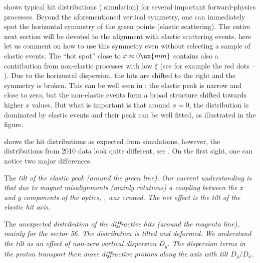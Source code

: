  shows typical hit distributions ( simulation) for several important forward-physics processes. Beyond the aforementioned vertical symmetry, one can immediately spot the horizontal symmetry of the green points (elastic scattering). The entire next section  will be devoted to the alignment with elastic scattering events, here let us comment on how to use this symmetry even without selecting a sample of elastic events. The ``hot spot'' close to $x\approx 0\un{mm}$ contains also a contribution from non-elastic processes with low $\xi$ (see for example the red dots -- ). Due to the horizontal dispersion, the hits are shifted to the right and the symmetry is broken. This can be well seen in : the elastic peak is narrow and close to zero, but the non-elastic events form a broad structure shifted towards higher $x$ values. But what is important is that around $x=0$, the distribution is dominated by elastic events and their peak can be well fitted, as illustrated in the figure.


 shows the hit distributions as expected from simulations, however, the distributions from 2010 data look quite different, see . On the first sight, one can notice two major differences.

\> The \em{tilt of the elastic peak} (around the green line). Our current understanding is that due to  magnet misalignments (mainly rotations) a coupling between the $x$ and $y$ components of the optics, , was created. The net effect is the tilt of the elastic hit axis.

\> The \em{unexpected distribution of the diffractive hits} (around the magenta line), mainly for the sector 56. The distribution is tilted and deformed. We understand the tilt as an effect of non-zero vertical dispersion $D_y$. The dispersion terms in the proton transport  then move diffractive protons along the axis with tilt $D_y/D_x$.


